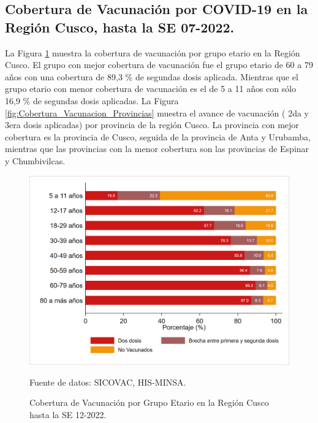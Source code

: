 \documentclass[12pt,a4paper,openany]{book}
\begin{document}
	\subsection*{Cobertura de Vacunación por COVID-19 en la Región Cusco, hasta la SE 07-2022.}
\noindent La Figura \ref{fig:vacuna_edad} muestra la cobertura de vacunación por grupo etario en la Región Cusco. El grupo con mejor cobertura de vacunación fue el grupo etario de 60 a 79 años con una cobertura de 89,3 $\%$ de  segundas dosis aplicada. Mientras que el grupo etario con menor cobertura de vacunación es el de 5 a 11 años con sólo 16,9 $\%$ de segundas dosis aplicadas.
La Figura \ref{fig:Cobertura_Vacunacion_Provincias} muestra el avance de vacunación ( 2da y 3era dosis aplicadas) por provincia de la región Cusco. La provincia con mejor cobertura es la provincia de Cusco, seguida de la provincia de Anta y Urubamba, mientras que las provincias con la menor cobertura son las provincias de Espinar y Chumbivilcas.  
\begin{figure}[h]
	\caption{Cobertura de Vacunación por Grupo Etario en la Región Cusco hasta la SE 12-2022. }\label{fig:vacuna_edad}
	\begin{center}
		\includegraphics[width=0.90\linewidth]{../figuras/vacunacion_grupo_edad.png}
	\end{center}
	{\footnotesize {Fuente de datos: SICOVAC, HIS-MINSA.}}
\end{figure}
\clearpage
\end{document}
